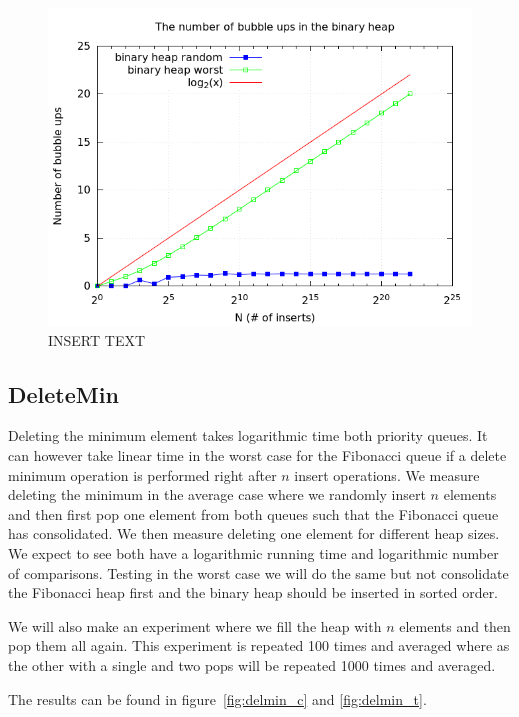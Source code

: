 \documentclass[a4paper,oneside,article,11pt]{memoir}
\begin{document}
\begin{figure}[H]
\centering
  \includegraphics[scale=0.5]{../res/inserts/insert_bubble_up.png}%
  \caption{INSERT TEXT}
  \label{fig:bubble_ups}
\end{figure}

\subsection{DeleteMin}
Deleting the minimum element takes logarithmic time both priority queues. It can however take linear time in the worst case for the Fibonacci queue if a delete minimum operation is performed right after $n$ insert operations. We measure deleting the minimum in the average case where we randomly insert $n$ elements and then first pop one element from both queues such that the Fibonacci queue has consolidated. We then measure deleting one element for different heap sizes. We expect to see both have a logarithmic running time and logarithmic number of comparisons.
Testing in the worst case we will do the same but not consolidate the Fibonacci heap first and the binary heap should be inserted in sorted order.

We will also make an experiment where we fill the heap with $n$ elements and then pop them all again. This experiment is repeated 100 times and averaged where as the other with a single and two pops will be repeated 1000 times and averaged.

The results can be found in figure~\ref{fig:delmin_c} and \ref{fig:delmin_t}.
\end{document}
